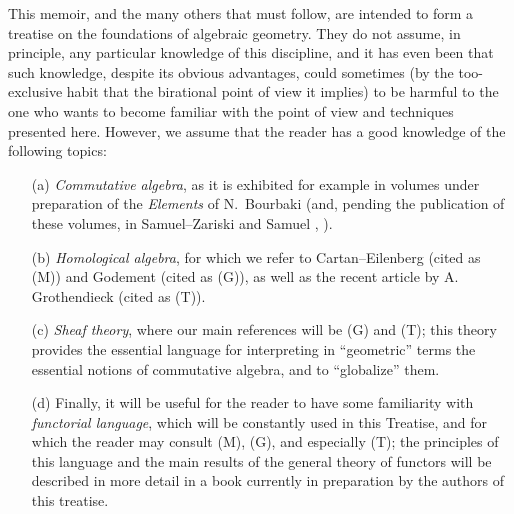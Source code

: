 \documentclass[10pt,oneside]{book}
\begin{document}
This memoir, and the many others that must follow, are intended to
form a treatise on the foundations of algebraic geometry. They do not assume, in
principle, any particular knowledge of this discipline, and it has even been
that such knowledge, despite its obvious advantages, could sometimes (by the
too-exclusive habit that the birational point of view it implies) to be harmful
to the one who wants to become familiar with the point of view and techniques
presented here. However, we assume that the reader has a good knowledge of the
following topics:
\begin{itemize}
  \item[(a)] \emph{Commutative algebra}, as it is exhibited for example in
             volumes under preparation of the \emph{Elements} of N.~Bourbaki
             (and, pending the publication of these volumes, in Samuel--Zariski
             \cite{13} and Samuel \cite{11}, \cite{12}).
  \item[(b)] \emph{Homological algebra}, for which we refer to Cartan--Eilenberg
             \cite{2} (cited as (M)) and Godement \cite{4} (cited as (G)), as well
             as the recent article by A. Grothendieck \cite{6} (cited as (T)).
  \item[(c)] \emph{Sheaf theory}, where our main references will be (G) and (T);
             this theory provides the essential language for interpreting in
             ``geometric'' terms the essential notions of commutative algebra,
             and to ``globalize'' them.
  \item[(d)] Finally, it will be useful for the reader to have some familiarity with
             \emph{functorial language}, which will be constantly used in this Treatise,
             and for which the reader may consult (M), (G), and especially (T); the
             principles of this language and the main results of the general theory of
             functors will be described in more detail in a book currently in preparation
             by the authors of this treatise.
\end{itemize}

\asttri
\end{document}
